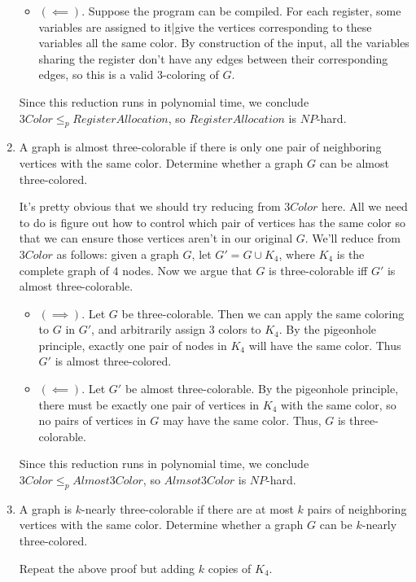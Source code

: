 \documentclass[fleqn]{article}
\begin{document}
\begin{enumerate}
\begin{answer}
\begin{itemize}
            \item $(\impliedby)$. Suppose the program can be compiled. For each register, some variables are assigned to it|give the vertices corresponding to these variables all the same color. By construction of the input, all the variables sharing the register don't have any edges between their corresponding edges, so this is a valid 3-coloring of $G$.
        \end{itemize}
        Since this reduction runs in polynomial time, we conclude $3Color \leq_p RegisterAllocation$, so $RegisterAllocation$ is $NP$-hard.
    \end{answer}
    \item A graph is almost three-colorable if there is only one pair of neighboring vertices with the same color. Determine whether a graph $G$ can be almost three-colored.
    \begin{answer}
        It's pretty obvious that we should try reducing from $3Color$ here. All we need to do is figure out how to control which pair of vertices has the same color so that we can ensure those vertices aren't in our original $G$. We'll reduce from $3Color$ as follows: given a graph $G$, let $G' = G \cup K_4$, where $K_4$ is the complete graph of $4$ nodes. Now we argue that $G$ is three-colorable iff $G'$ is almost three-colorable.
        \begin{itemize}
            \item $(\implies)$. Let $G$ be three-colorable. Then we can apply the same coloring to $G$ in $G'$, and arbitrarily assign $3$ colors to $K_4$. By the pigeonhole principle, exactly one pair of nodes in $K_4$ will have the same color. Thus $G'$ is almost three-colored.
            \item $(\impliedby)$. Let $G'$ be almost three-colorable. By the pigeonhole principle, there must be exactly one pair of vertices in $K_4$ with the same color, so no pairs of vertices in $G$ may have the same color. Thus, $G$ is three-colorable.
        \end{itemize}
        Since this reduction runs in polynomial time, we conclude $3Color \leq_p Almost3Color$, so $Almsot3Color$ is $NP$-hard.
    \end{answer}
    \item A graph is $k$-nearly three-colorable if there are at most $k$ pairs of neighboring vertices with the same color. Determine whether a graph $G$ can be $k$-nearly three-colored.
    \begin{answer}
        Repeat the above proof but adding $k$ copies of $K_4$.
    \end{answer}
\end{enumerate}
\end{document}
